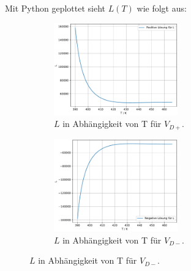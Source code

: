 Mit Python geplottet sieht $L(T)$ wie folgt aus:
\begin{figure}
  \begin{subfigure}{0.3\textwidth}
  \centering
  \includegraphics[height=4cm]{Python/plote.pdf}
  \caption{$L$ in Abhängigkeit von T für $V_{D+}$.}
  \label{fig:Verdampfungswärme1}
  \end{subfigure}
  \hfill
  \begin{subfigure}{0.3\textwidth}
  \centering
  \includegraphics[height=4cm]{Python/plotf.pdf}
  \caption{$L$ in Abhängigkeit von T für $V_{D-}$.}
  \label{fig:Verdampfungswärme2}
  \end{subfigure}
\end{figure}
